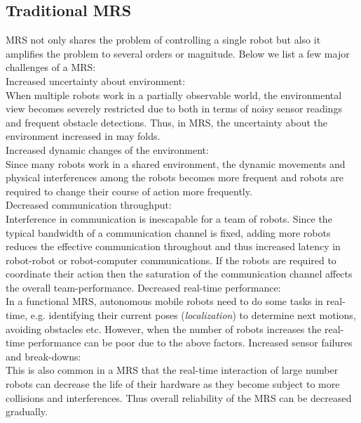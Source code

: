 \subsection{Traditional MRS}
\label{bg:mrs:mrs}
MRS not only shares the problem of controlling a single robot but also it amplifies the problem to several orders or magnitude. Below we list a few major challenges of a MRS:\\
Increased uncertainty about environment:\\
When multiple robots work in a partially observable world, the  environmental view becomes severely restricted due to both in terms of noisy sensor readings and frequent obstacle detections. Thus, in MRS, the uncertainty about the environment increased in may folds.\\
Increased dynamic changes of the environment:\\
Since many robots work in a shared environment, the dynamic movements and physical interferences among the robots becomes more frequent and robots are required to change their course of action more frequently.\\
Decreased communication throughput:\\
Interference in communication is inescapable for a team of robots. Since the typical bandwidth of a communication channel is fixed, adding  more robots reduces the effective communication throughout and thus increased latency in robot-robot or robot-computer communications. If the robots are required to coordinate their  action then the saturation of the communication channel affects the overall team-performance.
Decreased real-time performance:\\
In a functional MRS,  autonomous mobile robots need to do some tasks in real-time, e.g. identifying their current poses ({\em localization}) to determine next motions,  avoiding obstacles etc. However, when the number of robots increases the real-time performance can be poor due to the above factors.
Increased sensor failures and break-downs:\\
This is also common in a MRS that the real-time interaction of large number robots can decrease the life of their hardware as they become subject to more collisions and interferences. Thus overall reliability of the MRS can be decreased gradually.

